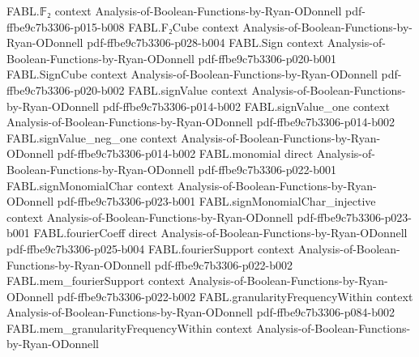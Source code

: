 \begin{theorem}
\label{FABL.oddWeightPartialSumUniformStringTester_acceptance_eq_expect}
\leanok
{}
\proofstep
  {FABL.𝔽₂}
  {context}
  {Analysis-of-Boolean-Functions-by-Ryan-ODonnell}
  {pdf-ffbe9c7b3306-p015-b008}
\proofstep
  {FABL.F₂Cube}
  {context}
  {Analysis-of-Boolean-Functions-by-Ryan-ODonnell}
  {pdf-ffbe9c7b3306-p028-b004}
\proofstep
  {FABL.Sign}
  {context}
  {Analysis-of-Boolean-Functions-by-Ryan-ODonnell}
  {pdf-ffbe9c7b3306-p020-b001}
\proofstep
  {FABL.SignCube}
  {context}
  {Analysis-of-Boolean-Functions-by-Ryan-ODonnell}
  {pdf-ffbe9c7b3306-p020-b002}
\proofstep
  {FABL.signValue}
  {context}
  {Analysis-of-Boolean-Functions-by-Ryan-ODonnell}
  {pdf-ffbe9c7b3306-p014-b002}
\proofstep
  {FABL.signValue_one}
  {context}
  {Analysis-of-Boolean-Functions-by-Ryan-ODonnell}
  {pdf-ffbe9c7b3306-p014-b002}
\proofstep
  {FABL.signValue_neg_one}
  {context}
  {Analysis-of-Boolean-Functions-by-Ryan-ODonnell}
  {pdf-ffbe9c7b3306-p014-b002}
\proofstep
  {FABL.monomial}
  {direct}
  {Analysis-of-Boolean-Functions-by-Ryan-ODonnell}
  {pdf-ffbe9c7b3306-p022-b001}
\proofstep
  {FABL.signMonomialChar}
  {context}
  {Analysis-of-Boolean-Functions-by-Ryan-ODonnell}
  {pdf-ffbe9c7b3306-p023-b001}
\proofstep
  {FABL.signMonomialChar_injective}
  {context}
  {Analysis-of-Boolean-Functions-by-Ryan-ODonnell}
  {pdf-ffbe9c7b3306-p023-b001}
\proofstep
  {FABL.fourierCoeff}
  {direct}
  {Analysis-of-Boolean-Functions-by-Ryan-ODonnell}
  {pdf-ffbe9c7b3306-p025-b004}
\proofstep
  {FABL.fourierSupport}
  {context}
  {Analysis-of-Boolean-Functions-by-Ryan-ODonnell}
  {pdf-ffbe9c7b3306-p022-b002}
\proofstep
  {FABL.mem_fourierSupport}
  {context}
  {Analysis-of-Boolean-Functions-by-Ryan-ODonnell}
  {pdf-ffbe9c7b3306-p022-b002}
\proofstep
  {FABL.granularityFrequencyWithin}
  {context}
  {Analysis-of-Boolean-Functions-by-Ryan-ODonnell}
  {pdf-ffbe9c7b3306-p084-b002}
\proofstep
  {FABL.mem_granularityFrequencyWithin}
  {context}
  {Analysis-of-Boolean-Functions-by-Ryan-ODonnell}

\end{theorem}
